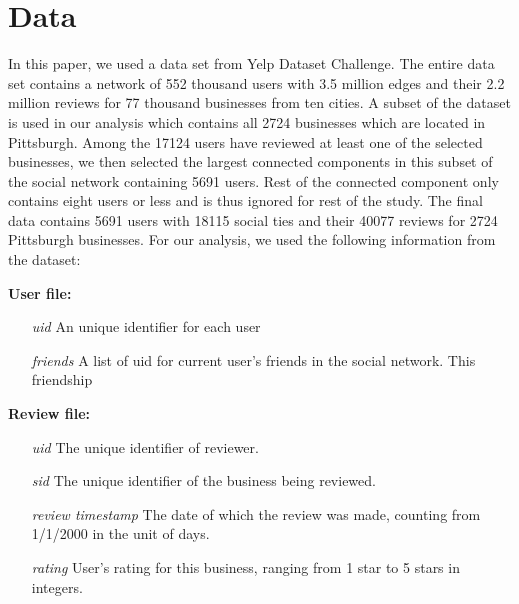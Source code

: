 \section{Data}
In this paper, we used a data set from Yelp Dataset Challenge. The entire data set contains
a network of 552 thousand users with 3.5 million edges and their 2.2 million reviews for
77 thousand businesses from ten cities. A subset of the dataset is used in our analysis
which contains all 2724 businesses which are located in Pittsburgh. Among the 17124 users
have reviewed at least one of the selected businesses, we then selected the largest connected
components in this subset of the social network containing 5691 users. Rest of the connected
component only contains eight users or less and is thus ignored for rest of the study. The final
data contains 5691 users with 18115 social ties and their 40077 reviews for 2724 Pittsburgh
businesses. For our analysis, we used the following information from the dataset:

\textbf{User file:}
\begin{enumerate}[wide=0pt, labelwidth=40pt]
    \item[\emph{uid}] An unique identifier for each user
    \item[\emph{friends}] A list of uid for current user’s friends in the social network. This friendship
\end{enumerate}

\textbf{Review file:}
\begin{enumerate}[wide=0pt, labelwidth=40pt]
    \item[\emph{uid}] The unique identifier of reviewer.
    \item[\emph{sid}] The unique identifier of the business being reviewed.
    \item[\emph{review timestamp}] The date of which the review was made, counting from 1/1/2000 in the
    unit of days.
    \item[\emph{rating}] User’s rating for this business, ranging from 1 star to 5 stars in integers.
\end{enumerate}